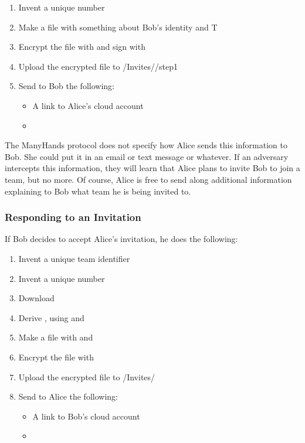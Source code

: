 \documentclass[pldi,10pt,preprint]{sigplanconf-pldi16}
\begin{document}
\begin{enumerate}
\item Invent a unique number 
\item Make a file with something about Bob's identity and T
\item Encrypt the file with  and sign with 
\item Upload the encrypted file to \slash Invites\slash {}\slash step1
\item Send to Bob the following:
  \begin{itemize}
  \item A link to Alice's cloud account
  \item {}
  \end{itemize}
\end{enumerate}

The ManyHands protocol does not specify how Alice sends this information to Bob.
She could put it in an email or text message or whatever.
If an adversary intercepts this information, they will learn that Alice plans to invite Bob to join a team, but no more.
Of course, Alice is free to send along additional information explaining to Bob what team he is being invited to.

\subsubsection{Responding to an Invitation}

If Bob decides to accept Alice's invitation, he does the following:

\begin{enumerate}
\item Invent a unique team identifier 
\item Invent a unique number 
\item Download 
\item Derive , using  and 
\item Make a file with  and 
\item Encrypt the file with 
\item Upload the encrypted file to \slash Invites\slash {}
\item Send to Alice the following:
  \begin{itemize}
  \item A link to Bob's cloud account
  \item {}
  \end{itemize}
\end{enumerate}
\end{document}
